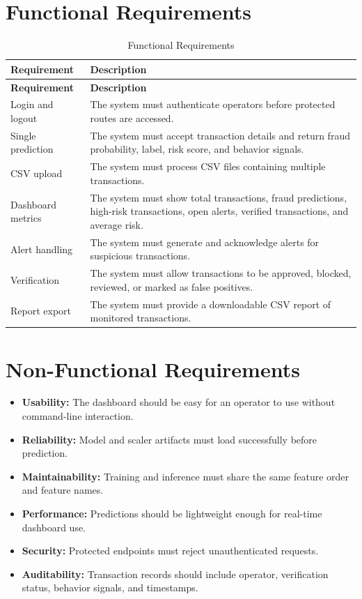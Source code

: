 \documentclass[12pt,a4paper]{report}
\begin{document}
\section{Functional Requirements}
\begin{longtable}{|p{}|p{}|}
\caption{Functional Requirements}
\label{tab:functional-requirements}\\
\hline
\textbf{Requirement} & \textbf{Description} \\ \hline
\endfirsthead
\hline
\textbf{Requirement} & \textbf{Description} \\ \hline
\endhead
Login and logout & The system must authenticate operators before protected routes are accessed. \\ \hline
Single prediction & The system must accept transaction details and return fraud probability, label, risk score, and behavior signals. \\ \hline
CSV upload & The system must process CSV files containing multiple transactions. \\ \hline
Dashboard metrics & The system must show total transactions, fraud predictions, high-risk transactions, open alerts, verified transactions, and average risk. \\ \hline
Alert handling & The system must generate and acknowledge alerts for suspicious transactions. \\ \hline
Verification & The system must allow transactions to be approved, blocked, reviewed, or marked as false positives. \\ \hline
Report export & The system must provide a downloadable CSV report of monitored transactions. \\ \hline
\end{longtable}

\section{Non-Functional Requirements}
\begin{itemize}
    \item \textbf{Usability:} The dashboard should be easy for an operator to use without command-line interaction.
    \item \textbf{Reliability:} Model and scaler artifacts must load successfully before prediction.
    \item \textbf{Maintainability:} Training and inference must share the same feature order and feature names.
    \item \textbf{Performance:} Predictions should be lightweight enough for real-time dashboard use.
    \item \textbf{Security:} Protected endpoints must reject unauthenticated requests.
    \item \textbf{Auditability:} Transaction records should include operator, verification status, behavior signals, and timestamps.
\end{itemize}
\end{document}
